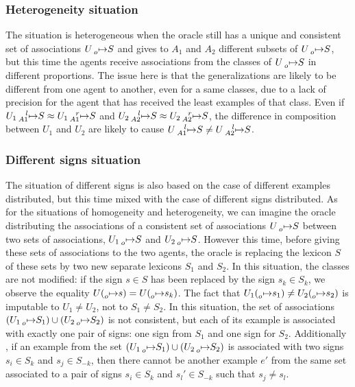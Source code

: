 \subsubsection{Heterogeneity situation} The situation is heterogeneous when the oracle still has a unique and consistent set of associations $U \prescript{}{o}{\mapsto} S$ and gives to $A_{1}$ and $A_{2}$ different subsets of $U \prescript{}{o}{\mapsto} S$, but this time the agents receive associations from the classes of $U \prescript{}{o}{\mapsto} S$ in different proportions. The issue here is that the generalizations are likely to be different from one agent to another, even for a same classes, due to a lack of precision for the agent that has received the least examples of that class. Even if $U_{1} \prescript{l}{A1}{\mapsto} S \approx U_{1} \prescript{r}{A1}{\mapsto} S$ and $U_{2} \prescript{l}{A2}{\mapsto} S \approx U_{2} \prescript{r}{A2}{\mapsto} S$, the difference in composition between $U_{1}$ and $U_{2}$ are likely to cause $U \prescript{l}{A1}{\mapsto} S \neq U \prescript{l}{A2}{\mapsto} S$.

\subsubsection{Different signs situation} The situation of different signs is also based on the case of different examples distributed, but this time mixed with the case of different signs distributed. As for the situations of homogeneity and heterogeneity, we can imagine the oracle distributing the associations of a consistent set of associations $U \prescript{}{o}{\mapsto} S$ between two sets of associations, $U_{1} \prescript{}{o}{\mapsto} S$ and $U_{2} \prescript{}{o}{\mapsto} S$. However this time, before giving these sets of associations to the two agents, the oracle is replacing the lexicon $S$ of these sets by two new separate lexicons $S_{1}$ and $S_{2}$. In this situation, the classes are not modified: if the sign $s \in S$ has been replaced by the sign $s_{k} \in S_{k}$, we observe the equality $U(\prescript{}{o}{\mapsto} s) = U(\prescript{}{o}{\mapsto} s_{k})$. The fact that $U_{1}(\prescript{}{o}{\mapsto} s_{1}) \neq U_{2}(\prescript{}{o}{\mapsto} s_{2})$ is imputable to $U_{1} \neq U_{2}$, not to $S_{1} \neq S_{2}$. In this situation, the set of associations $(U_{1} \prescript{}{o}{\mapsto} S_{1}) \cup (U_{2} \prescript{}{o}{\mapsto} S_{2})$ is not consistent, but each of its example is associated with exactly one pair of signs: one sign from $S_{1}$ and one sign for $S_{2}$. Additionally , if an example from the set $(U_{1} \prescript{}{o}{\mapsto} S_{1}) \cup (U_{2} \prescript{}{o}{\mapsto} S_{2})$ is associated with two signs $s_{i} \in S_{k}$ and $s_{j} \in S_{-k}$, then there cannot be another example $e'$ from the same set associated to a pair of signs $s_{i} \in S_{k}$ and $s_{l}' \in S_{-k}$ such that $s_{j} \neq s_{l}$.

